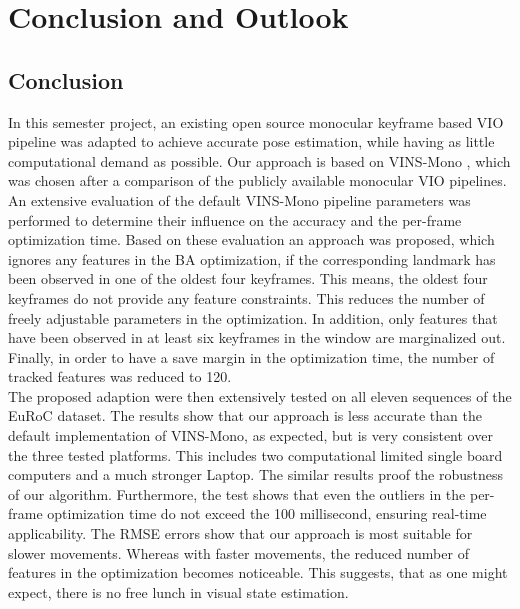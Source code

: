 \chapter{Conclusion and Outlook} 
\label{ch:conclusion}


\section{Conclusion}
In this semester project, an existing open source monocular keyframe based 
\ac{VIO} pipeline was adapted to achieve accurate pose estimation, while having 
as little computational demand as possible. Our approach is based on VINS-Mono 
\citep{Qin2017VINS}, which was chosen after a comparison of the publicly 
available monocular \ac{VIO} pipelines. \\

An extensive evaluation of the default VINS-Mono pipeline parameters was 
performed to determine their influence on the accuracy and the per-frame 
optimization time. Based on these evaluation an approach was proposed, which 
ignores any features in the \ac{BA} optimization, if the corresponding landmark 
has been observed in one of the oldest four keyframes. This means, the oldest 
four keyframes do not provide any feature constraints. This reduces the number 
of freely adjustable parameters in the optimization. In addition, only features 
that have been observed in at least six keyframes in the window are marginalized 
out. Finally, in order to have a save margin in the optimization time, the 
number of tracked features was reduced to 120. \\

The proposed adaption were then extensively tested on all eleven sequences of 
the EuRoC dataset. The results show that our approach is less accurate than the 
default implementation of VINS-Mono, as expected, but is very consistent over 
the three 
tested platforms. This includes two computational limited single board 
computers and a much stronger Laptop. The similar results proof the robustness 
of our algorithm. Furthermore, the test shows that even the outliers in the 
per-frame optimization time do not exceed the 100 millisecond, ensuring 
real-time applicability. The RMSE errors show that our approach is most suitable 
for slower movements. Whereas with faster movements, the reduced number of 
features in the optimization becomes noticeable. This suggests, that as one 
might expect, there is no free lunch in visual state estimation. \\

